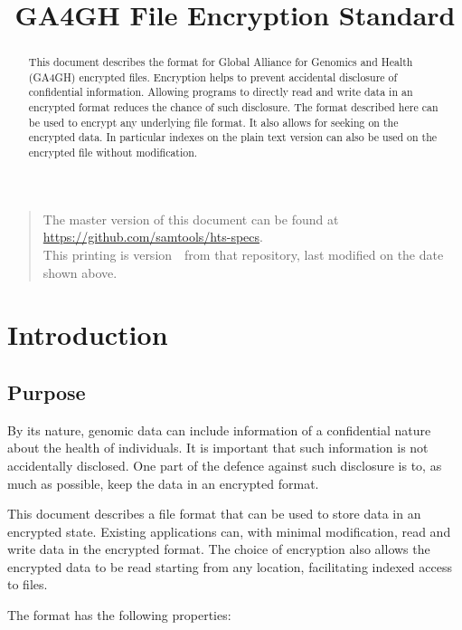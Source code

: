 \documentclass[10pt]{article}
\begin{document}

\title{GA4GH File Encryption Standard}
\date{\headdate}
\maketitle
\begin{quote}\small
The master version of this document can be found at
\url{https://github.com/samtools/hts-specs}.\\
This printing is version~\commitdesc\ from that repository,
last modified on the date shown above.
\end{quote}
\vspace*{1em}

\begin{abstract}
This document describes the format for Global Alliance for Genomics and Health (GA4GH) encrypted files.
Encryption helps to prevent accidental disclosure of confidential information.
Allowing programs to directly read and write data in an encrypted format reduces the chance of such disclosure.
The format described here can be used to encrypt any underlying file format.
It also allows for seeking on the encrypted data.
In particular indexes on the plain text version can also be used on the encrypted file without modification.
\end{abstract}
\newpage
\tableofcontents
\newpage
\section{Introduction}
\subsection{Purpose}
By its nature, genomic data can include information of a confidential nature about the health of individuals.
It is important that such information is not accidentally disclosed.
One part of the defence against such disclosure is to, as much as possible, keep the data in an encrypted format.

This document describes a file format that can be used to store data in an encrypted state.
Existing applications can, with minimal modification, read and write data in the encrypted format.
The choice of encryption also allows the encrypted data to be read starting from any location, facilitating indexed
access to files.

The format has the following properties:
\end{document}
